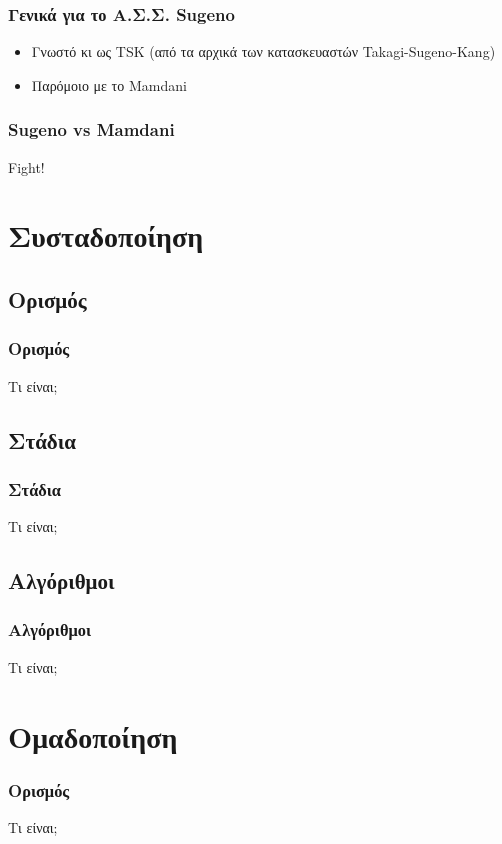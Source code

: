 \documentclass[xetex,serif,mathserif,14pt]{beamer}
\begin{document}
\begin{frame}
\frametitle{Γενικά για το Α.Σ.Σ. Sugeno}
\begin{itemize}
  \item Γνωστό κι ως TSK (από τα αρχικά των κατασκευαστών Takagi-Sugeno-Kang)
  \item Παρόμοιο με το Mamdani
\end{itemize}
\end{frame}

\begin{frame}
\frametitle{Sugeno vs Mamdani}
Fight!
\end{frame}


\section{Συσταδοποίηση}

\subsection{Ορισμός}

\begin{frame}
\frametitle{Ορισμός}
Τι είναι;
\end{frame}

\subsection{Στάδια}

\begin{frame}
\frametitle{Στάδια}
Τι είναι;
\end{frame}

\subsection{Αλγόριθμοι}

\begin{frame}
\frametitle{Αλγόριθμοι}
Τι είναι;
\end{frame}


\section{Ομαδοποίηση}

\begin{frame}
\frametitle{Ορισμός}
Τι είναι;
\end{frame}
\end{document}
